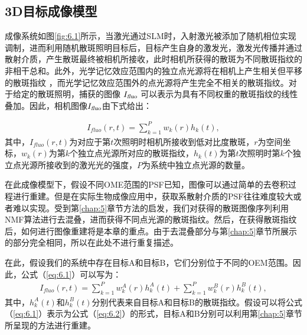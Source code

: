 \subsection{3D目标成像模型}

成像系统如图\ref{fig:6.1}所示，当激光通过SLM时，入射激光被添加了随机相位实现调制，进而利用随机散斑照明目标后，目标产生自身的激发光，激发光传播并通过散射介质，产生散斑最终被相机所接收，此时相机所获得的散斑为不同散斑指纹的非相干总和。此外，光学记忆效应范围内的独立点光源将在相机上产生相关但平移的散斑指纹 \cite{Freund1988}，而光学记忆效应范围外的点光源将产生完全不相关的散斑指纹。对于给定的散斑照明，捕获的图像 $I_{\textsl{fluo}}$ 可以表示为具有不同权重的散斑指纹的线性叠加。因此，相机图像$I_{\textsl{fluo}}$由下式给出：

\begin{equation}
\begin{aligned}
I_{fluo}(r,t) = \sum^{P}_{k=1} w_{k}(r) h_{k}(t),
\label{eq:6.1}
\end{aligned}
\end{equation}
其中，$I_{fluo}(r,t)$为对应于第$t$次照明时相机所接收到低对比度散斑，$r$为空间坐标，$w_{k}(r)$为第$k$个独立点光源所对应的散斑指纹，$h_{k}(t)$为第$t$次照明时第$k$个独立点光源所接收到的激光光的强度，$P$为系统中独立点光源的数量。

在此成像模型下，假设不同OME范围的PSF已知，图像可以通过简单的去卷积过程进行重建。但是在实际生物成像应用中，获取系散射介质的PSF往往难度较大或者难以实现。受到第\ref{chap:5}章节方法的启发，我们对获得的散斑图像序列利用NMF算法进行去混叠，进而获得不同点光源的散斑指纹。然后，在获得散斑指纹后，如何进行图像重建将是本章的重点。由于去混叠部分与第\ref{chap:5}章节所展示的部分完全相同，所以在此处不进行重复描述。

在此，假设我们的系统中存在目标A和目标B，它们分别位于不同的OEM范围。因此，公式（\ref{eq:6.1}）可以写为：
\begin{equation}
\begin{aligned}
I_{fluo}(r,t) = \sum^{P}_{k=1} w_{k}^{A}(r) h_{k}^{A}(t)+\sum^{P}_{k=1} w_{k}^{B}(r) h_{k}^{B}(t),
\label{eq:6.2}
\end{aligned}
\end{equation}
其中，$h_{k}^{A}(t)$和$h_{k}^{B}(t)$分别代表来自目标A和目标B的散斑指纹。假设可以将公式（\ref{eq:6.1}）表示为公式（\ref{eq:6.2}）的形式，目标A和B分别可以利用第\ref{chap:5}章节所呈现的方法进行重建。

